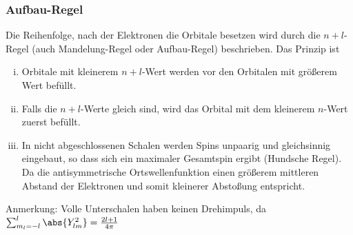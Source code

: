 \documentclass[twocolumn]{summery_4.1}
\begin{document}
\subsubsection{Aufbau-Regel}
Die Reihenfolge, nach der Elektronen die Orbitale besetzen wird durch die \(n+l\)-Regel (auch Mandelung-Regel oder Aufbau-Regel) beschrieben. Das Prinzip ist 
\begin{enumerate}[(i)]
    \item Orbitale mit kleinerem \(n+l\)-Wert werden vor den Orbitalen mit größerem Wert befüllt.
    \item Falls die \(n+l\)-Werte gleich sind, wird das Orbital mit dem kleinerem \(n\)-Wert zuerst befüllt.
    \item In nicht abgeschlossenen Schalen werden Spins unpaarig und
    gleichsinnig eingebaut, so dass sich ein maximaler Gesamtspin ergibt (Hundsche Regel). Da die antisymmetrische Ortswellenfunktion einen größerem mittleren Abstand der Elektronen und somit kleinerer Abstoßung entspricht. 
\end{enumerate}
\begin{figure}[H]
    \centering
    
\end{figure}
Anmerkung: Volle Unterschalen haben keinen Drehimpuls, da \(\sum_{m_l=-l}^l \abs{Y_{lm}^2} = \frac{2l+1}{4\pi }\)
\end{document}
